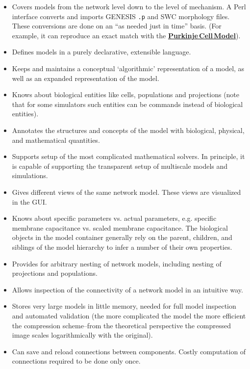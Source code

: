 \documentclass[12pt]{article}
\begin{document}
\begin{itemize}

\item Covers models from the network level down to the level of mechanism. A Perl interface converts and imports GENESIS {\tt .p} and SWC morphology files. These conversions are done on an ``as needed just in time'' basis. (For example, it can reproduce an exact match with the \href{../purkinje-cell-model/purkinje-cell-model.tex}{\bf Purkinje\,Cell\,Model}).

\item Defines models in a purely declarative, extensible language.

\item Keeps and maintains a conceptual `algorithmic' representation of a model, as well as an expanded representation of the model.

\item Knows about biological entities like cells, populations and projections (note that for some simulators such entities can be commands instead of biological entities).

\item Annotates the structures and concepts of the model with biological, physical, and mathematical quantities.

\item Supports setup of the most complicated mathematical solvers. In principle, it is capable of supporting the transparent setup of multiscale models and simulations.

\item Gives different views of the same network model. These views are visualized in the GUI.

\item Knows about specific parameters vs. actual parameters, e.g. specific membrane capacitance vs. scaled membrane capacitance. The biological objects in the model container generally rely on the parent, children, and siblings of the model hierarchy to infer a number of their own properties.

\item Provides for arbitrary nesting of network models, including nesting of projections and populations.

\item Allows inspection of the connectivity of a network model in an intuitive way.

\item Stores very large models in little memory, needed for full model inspection and automated validation (the more complicated the model the more efficient the compression scheme--from the theoretical perspective the compressed image scales logarithmically with the original).

\item Can save and reload connections between components. Costly computation of connections required to be done only once.
    
\end{itemize}
\end{document}
